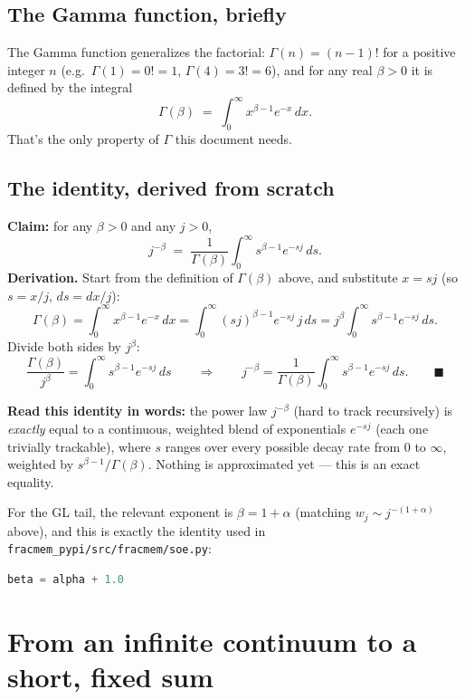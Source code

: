 \documentclass[11pt]{article}
\begin{document}
\subsection{The Gamma function, briefly}
The Gamma function generalizes the factorial: $\Gamma(n) = (n-1)!$ for a positive integer $n$ (e.g.\ $\Gamma(1)=0!=1$, $\Gamma(4)=3!=6$), and for any real $\beta>0$ it is defined by the integral
\[
\Gamma(\beta) \;=\; \int_0^\infty x^{\beta-1}e^{-x}\,dx.
\]
That's the only property of $\Gamma$ this document needs.

\subsection{The identity, derived from scratch}
\textbf{Claim:} for any $\beta>0$ and any $j>0$,
\[
j^{-\beta} \;=\; \frac{1}{\Gamma(\beta)}\int_0^\infty s^{\beta-1}e^{-sj}\,ds.
\]
\textbf{Derivation.} Start from the definition of $\Gamma(\beta)$ above, and substitute $x = sj$ (so $s = x/j$, $ds = dx/j$):
\[
\Gamma(\beta) = \int_0^\infty x^{\beta-1}e^{-x}\,dx
= \int_0^\infty (sj)^{\beta-1} e^{-sj}\, j\,ds
= j^{\beta}\int_0^\infty s^{\beta-1}e^{-sj}\,ds.
\]
Divide both sides by $j^\beta$:
\[
\frac{\Gamma(\beta)}{j^\beta} = \int_0^\infty s^{\beta-1}e^{-sj}\,ds
\qquad\Longrightarrow\qquad
j^{-\beta} = \frac{1}{\Gamma(\beta)}\int_0^\infty s^{\beta-1}e^{-sj}\,ds. \qquad\blacksquare
\]

\begin{keyidea}
\textbf{Read this identity in words:} the power law $j^{-\beta}$ (hard to track recursively) is \emph{exactly} equal to a continuous, weighted blend of exponentials $e^{-sj}$ (each one trivially trackable), where $s$ ranges over every possible decay rate from $0$ to $\infty$, weighted by $s^{\beta-1}/\Gamma(\beta)$. Nothing is approximated yet --- this is an exact equality.
\end{keyidea}

For the GL tail, the relevant exponent is $\beta = 1+\alpha$ (matching $w_j\sim j^{-(1+\alpha)}$ above), and this is exactly the identity used in \texttt{fracmem\_pypi/src/fracmem/soe.py}:
\begin{lstlisting}[language=Python]
beta = alpha + 1.0
\end{lstlisting}

\section{From an infinite continuum to a short, fixed sum}
\end{document}
